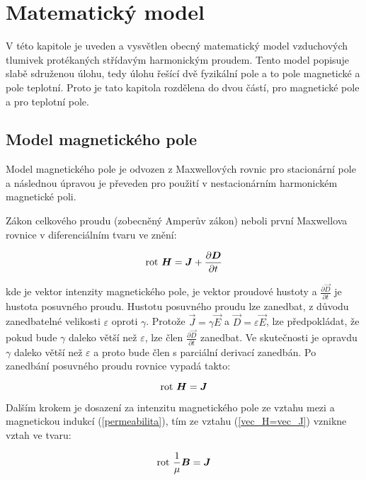 \chapter{Matematický model} 
\label{matematicky_model}
V této kapitole je uveden a vysvětlen obecný matematický model vzduchových tlumivek protékaných střídavým harmonickým proudem. Tento model popisuje slabě sdruženou úlohu, tedy úlohu řešící dvě fyzikální pole a to pole magnetické a pole teplotní. Proto je tato kapitola rozdělena do dvou částí, pro magnetické pole a pro teplotní pole.

\section{Model magnetického pole}
Model magnetického pole je odvozen z Maxwellových rovnic pro stacionární pole a následnou úpravou je převeden pro použití v nestacionárním harmonickém magnetické poli.

	Zákon celkového proudu (zobecněný Amperův zákon) neboli první Maxwellova rovnice v diferenciálním tvaru ve znění:
	
\begin{equation}
	\mathrm{rot}\  \mbox{\boldmath$H$} = \mbox{\boldmath$J$} + \frac{\partial \mbox{\boldmath$D$}}{\partial t}
	\label{amperuv_zakon}
\end{equation}

kde  je vektor intenzity magnetického pole,  je vektor proudové hustoty a $\frac{\partial \vec{D}}{\partial t}$ je hustota posuvného proudu. Hustotu posuvného proudu lze zanedbat, z důvodu zanedbatelné velikosti $\varepsilon$ oproti $\gamma$. Protože $\vec{J} =\gamma \vec{E} $ a $\vec{D} =\varepsilon \vec{E} $, lze předpokládat, že pokud bude $\gamma$ daleko větší než $\varepsilon$, lze člen $\frac{\partial \vec{D}}{\partial t}$ zanedbat. Ve skutečnosti je opravdu $\gamma$ daleko větší než $\varepsilon$ a proto bude člen s parciální derivací zanedbán.
Po zanedbání posuvného proudu rovnice vypadá takto:

\begin{equation}
	\mathrm{rot}\  \mbox{\boldmath$H$} = \mbox{\boldmath$J$}
	\label{vec_H=vec_J}
\end{equation}

Dalším krokem je dosazení za intenzitu magnetického pole  ze vztahu mezi  a magnetickou indukcí  (\ref{permeabilita}), tím ze vztahu (\ref{vec_H=vec_J}) vznikne vztah ve tvaru:

\begin{equation}
	\mathrm{rot}\  \frac{1}{\mu} {\mbox{\boldmath$B$}} = \mbox{\boldmath$J$}
\end{equation}

